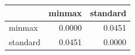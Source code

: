 \begin{tabular}{lrr}
\toprule
 & minmax & standard \\
\midrule
minmax & 0.0000 & 0.0451 \\
standard & 0.0451 & 0.0000 \\
\bottomrule
\end{tabular}
